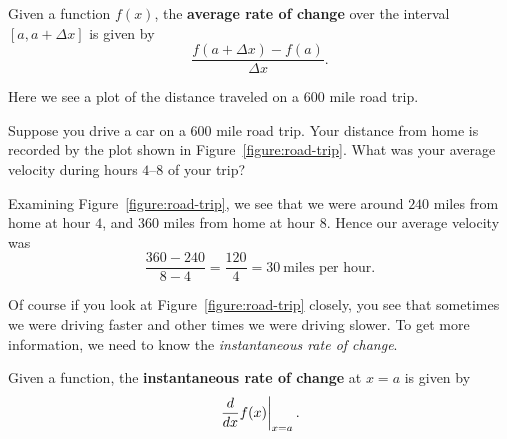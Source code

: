 \begin{definition}
Given a function $f(x)$, the \textbf{average rate of change} over the
interval $[a, a+\Delta x]$ is given by
\[
\frac{f(a+\Delta x) - f(a)}{\Delta x}.
\]
\end{definition}
\begin{marginfigure}
\caption{Here we see a plot of the distance traveled on a $600$ mile road trip.}
\label{figure:road-trip}
\end{marginfigure}

\begin{example}
Suppose you drive a car on a $600$ mile road trip. Your distance from
home is recorded by the plot shown in
Figure~\ref{figure:road-trip}. What was your average velocity during
hours $4$--$8$ of your trip?
\end{example}

\begin{solution}
Examining Figure~\ref{figure:road-trip}, we see that we were around
$240$ miles from home at hour $4$, and $360$ miles from home at hour
$8$. Hence our average velocity was
\[
\frac{360-240}{8-4} = \frac{120}{4} = 30~\text{miles per hour.}
\]
\end{solution}

Of course if you look at Figure~\ref{figure:road-trip} closely, you
see that sometimes we were driving faster and other times we were
driving slower. To get more information, we need to know the
\textit{instantaneous rate of change}.

\begin{definition}
Given a function, the \textbf{instantaneous rate of change} at $x=a$ is given by
\[
\left.\frac{d}{dx} f(x) \right|_{x=a}.
\] 
\end{definition}

